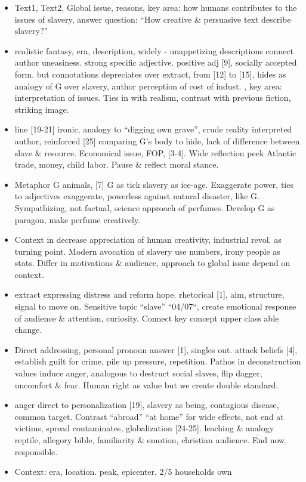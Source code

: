 \documentclass[a4paper,12pt]{article}
\begin{document}
\begin{itemize}
 \item Text1, Text2, Global issue, reasons, key area: how humans contributes to the issues of slavery, answer question: ``How creative \& persuasive text describe slavery?''
 \item realistic fantasy, era, description, widely - unappetizing descriptions connect author uneasiness.
 strong specific adjective. positive adj [9], socially accepted form. but connotations depreciates over extract, from [12] to [15], hides as analogy of G over slavery, author perception of cost of indust. , key area: interpretation of issues. Ties in with realism, contrast with previous fiction, striking image.
 \item line [19-21] ironic, analogy to ``digging own grave'', crude reality interpreted author, reinforced [25] comparing G's body to hide, lack of difference between slave \& resource. Economical issue, FOP, [3-4]. Wide reflection peek Atlantic trade, money, child labor. Pause \& reflect moral stance.
 \item Metaphor G animals, [7] G as tick slavery as ice-age. Exaggerate power, ties to adjectives exaggerate, powerless against natural disaster, like G. Sympathizing, not factual, science approach of perfumes. Develop G as paragon, make perfume creatively.
 \item Context in decrease appreciation of human creativity, industrial revol. as turning point. Modern avocation of slavery use numbers, irony people as stats. Differ in motivations \& audience, approach to global issue depend on context.

 \item extract expressing distress and reform hope. rhetorical [1], aim, structure, signal to move on. Sensitive topic ``slave'' ``04/07``, create emotional response of audience \& attention, curiosity. Connect key concept upper class able change.
 \item Direct addressing, personal pronoun answer [1], singles out. attack beliefs [4], establish guilt for crime, pile up pressure, repetition. Pathos in deconstruction values induce anger, analogous   to destruct social slaves, flip dagger, uncomfort \& fear. Human right as value but we create double standard.
 \item anger direct to personalization [19], slavery as being, contagious disease, common target. Contrast ``abroad'' ``at home'' for wide effects, not end at victims, spread  contaminates, globalization [24-25].  leaching \& analogy reptile, allegory bible, familiarity \& emotion, christian audience. End now, responsible.
 \item Context: era, location. peak, epicenter, 2/5 households own


\end{itemize}
\end{document}
